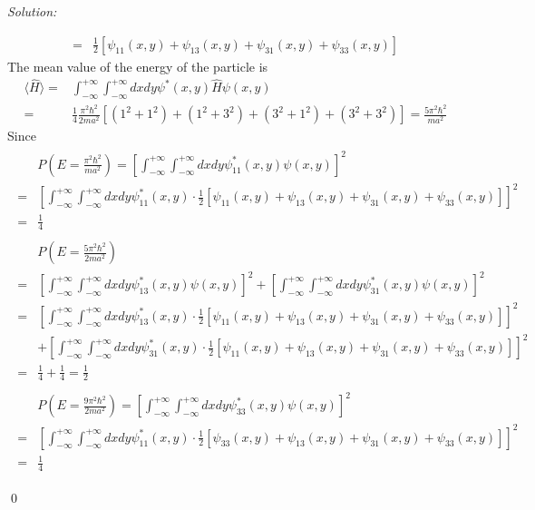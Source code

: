 \documentclass[12pt,a4paper]{article}
\newenvironment{sol}
    {\emph{Solution:}
    }
    {
    \qed
    }
\begin{document}
\begin{sol}
\begin{itemize}
\begin{itemize}
\begin{align}
=&\frac{1}{2}[\psi_{11}(x,y)+\psi_{13}(x,y)+\psi_{31}(x,y)+\psi_{33}(x,y)]
\end{align}
The mean value of the energy of the particle is
\begin{align}
\nonumber\langle\hat{H}\rangle=&\int_{-\infty}^{+\infty}\int_{-\infty}^{+\infty}dxdy\psi^*(x,y)\hat{H}\psi(x,y)\\
=&\frac{1}{4}\frac{\pi^2\hbar^2}{2ma^2}[(1^2+1^2)+(1^2+3^2)+(3^2+1^2)+(3^2+3^2)]=\frac{5\pi^2\hbar^2}{ma^2}
\end{align}
Since
\small\begin{gather}
\begin{align}
\nonumber&P\left(E=\frac{\pi^2\hbar^2}{ma^2}\right)=\left[\int_{-\infty}^{+\infty}\int_{-\infty}^{+\infty}dxdy\psi_{11}^*(x,y)\psi(x,y)\right]^2\\
\nonumber=&\left[\int_{-\infty}^{+\infty}\int_{-\infty}^{+\infty}dxdy\psi_{11}^*(x,y)\cdot\frac{1}{2}[\psi_{11}(x,y)+\psi_{13}(x,y)+\psi_{31}(x,y)+\psi_{33}(x,y)]\right]^2\\
=&\frac{1}{4}
\end{align}\\
\begin{align}
\nonumber&P\left(E=\frac{5\pi^2\hbar^2}{2ma^2}\right)\\
\nonumber=&\left[\int_{-\infty}^{+\infty}\int_{-\infty}^{+\infty}dxdy\psi_{13}^*(x,y)\psi(x,y)\right]^2+\left[\int_{-\infty}^{+\infty}\int_{-\infty}^{+\infty}dxdy\psi_{31}^*(x,y)\psi(x,y)\right]^2\\
\nonumber=&\left[\int_{-\infty}^{+\infty}\int_{-\infty}^{+\infty}dxdy\psi_{13}^*(x,y)\cdot\frac{1}{2}[\psi_{11}(x,y)+\psi_{13}(x,y)+\psi_{31}(x,y)+\psi_{33}(x,y)]\right]^2\\
\nonumber&+\left[\int_{-\infty}^{+\infty}\int_{-\infty}^{+\infty}dxdy\psi_{31}^*(x,y)\cdot\frac{1}{2}[\psi_{11}(x,y)+\psi_{13}(x,y)+\psi_{31}(x,y)+\psi_{33}(x,y)]\right]^2\\
=&\frac{1}{4}+\frac{1}{4}=\frac{1}{2}
\end{align}\\
\begin{align}
\nonumber&P\left(E=\frac{9\pi^2\hbar^2}{2ma^2}\right)=\left[\int_{-\infty}^{+\infty}\int_{-\infty}^{+\infty}dxdy\psi_{33}^*(x,y)\psi(x,y)\right]^2\\
\nonumber=&\left[\int_{-\infty}^{+\infty}\int_{-\infty}^{+\infty}dxdy\psi_{11}^*(x,y)\cdot\frac{1}{2}[\psi_{33}(x,y)+\psi_{13}(x,y)+\psi_{31}(x,y)+\psi_{33}(x,y)]\right]^2\\
=&\frac{1}{4}
\end{align}

\end{gather}
\end{itemize}
\end{itemize}
\end{sol}
\end{document}
